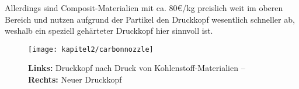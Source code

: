 Allerdings sind Composit-Materialien mit ca. 80€/kg preislich weit im oberen Bereich und nutzen aufgrund der Partikel den Druckkopf wesentlich schneller ab, weshalb ein speziell gehärteter Druckkopf hier sinnvoll ist.

\begin{figure}[h]
  \centering
  \texttt{[image: kapitel2/carbonnozzle]}
  \caption{\textbf{Links:} Druckkopf nach Druck von Kohlenstoff-Materialien -- \textbf{Rechts:} Neuer Druckkopf}
  \label{Kap2:CompositNozzle}
\end{figure}
